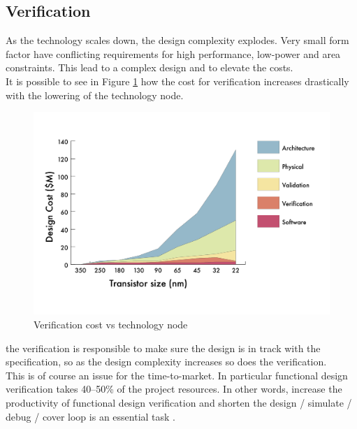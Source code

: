 \subsection{Verification}
As the technology scales down, the design complexity explodes. 
Very small form factor have conflicting requirements for high performance, low-power and area constraints. 
This lead to a complex design and to elevate the costs.\\

It is possible to see in Figure \ref{verification-tecnology} how the cost for verification increases drastically with the lowering of the technology node.


\begin{figure}[H]
    \centering
    \includegraphics[scale = 0.4]{Chapter_1/img/cost-scale.png}
    \caption{Verification cost vs technology node \cite{verification-book-2018}}
    \label{verification-tecnology}
\end{figure}

the verification is responsible to make sure the design is in track with the specification, so as the design complexity increases so does the verification.\\

This is of course an issue for the time-to-market. 
In particular functional design verification takes 40–50\% of the project resources. In other words, increase the productivity of functional design verification and shorten the design / simulate / debug / cover loop is an essential task \cite{verification-book-2018}.\\

